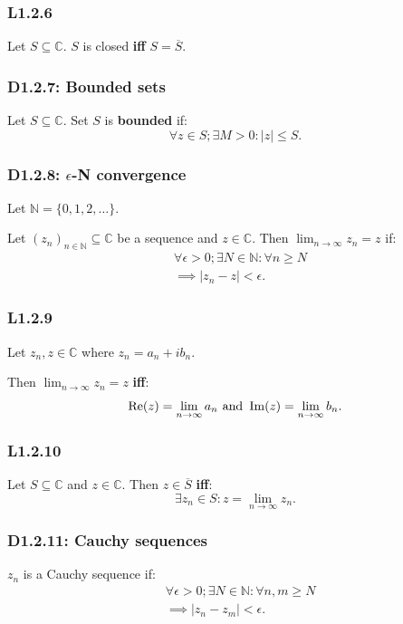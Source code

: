 \documentclass{article}
\begin{document}
\begin{multicols*}{3}
\subsubsection*{L1.2.6}
Let $S\subseteq\mathbb{C}$.
$S$ is closed \textbf{if{}f} $S=\overline{S}$.

\subsubsection*{D1.2.7: Bounded sets}
Let $S\subseteq\mathbb{C}$. Set $S$ is \textbf{bounded} if:
$$\forall z\in S;\exists M>0:|z|\leq S.$$

\subsubsection*{D1.2.8: $\epsilon$-N convergence}
Let $\mathbb{N}=\{0,1,2,\dots\}$.

Let $(z_n)_{n\in\mathbb{N}}\subseteq\mathbb{C}$ be a sequence
and $z\in\mathbb{C}$.
Then $\displaystyle\lim_{n\rightarrow\infty}z_n=z$ if:
\begin{align*}
    &\forall\epsilon>0;\exists N\in\mathbb{N}:\forall n\geq N \\
    &\implies |z_n-z|<\epsilon.
\end{align*}

\subsubsection*{L1.2.9}
Let $z_n,z\in\mathbb{C}$ where $z_n=a_n+i b_n$.

Then $\displaystyle\lim_{n\rightarrow\infty}z_n=z$ \textbf{if{}f}:
$$\Re(z)=\lim_{n\rightarrow\infty}a_n
\hspace{0.05in}\text{and}\hspace{0.05in}
\Im(z)=\lim_{n\rightarrow\infty}b_n.$$

\subsubsection*{L1.2.10}
Let $S\subseteq\mathbb{C}$ and $z\in\mathbb{C}$.
Then $z\in\overline{S}$ \textbf{if{}f}:
$$\exists z_n\in S: z=\lim_{n\rightarrow\infty}z_n.$$

\subsubsection*{D1.2.11: Cauchy sequences}
$z_n$ is a Cauchy sequence if:
\begin{align*}
    &\forall\epsilon>0;\exists N\in\mathbb{N}:
    \forall n,m\geq N \\
    &\implies |z_n-z_m|<\epsilon.
\end{align*}


\end{multicols*}
\end{document}
